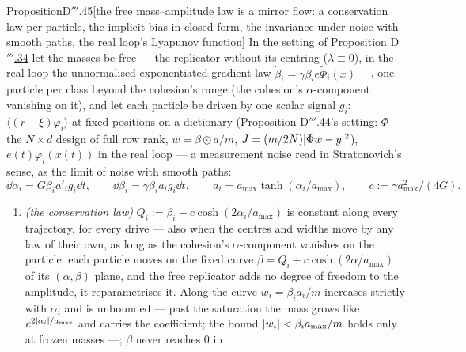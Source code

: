 \begin{thm}{Proposition}{D$'''$.45}[the free mass--amplitude law is a mirror flow: a conservation law per particle, the
implicit bias in closed form, the invariance under noise with smooth paths, the real loop's Lyapunov
function]\label{res:thmDppp:45}%
In the setting of \hyperref[res:thmDppp:34]{Proposition D$'''$.34} let the masses be free --- the replicator without its
centring ($\lambda\equiv0$), in the real loop the unnormalised exponentiated-gradient law
$\dot\beta_i = \gamma\beta_ie\tilde\Phi_i(x)$ ---, one particle per class beyond the cohesion's range (the cohesion's
$\alpha$-component vanishing on it), and let each particle be driven by one scalar signal $g_i$:
$\langle(r + \xi)\varphi_i\rangle$ at fixed positions on a dictionary (Proposition D$'''$.44's setting: $\Phi$ the
$N\times d$ design of full row rank, $w = \beta\odot a/m$, $J = (m/2N)\lvert \Phi w - y\rvert^2$), $e(t)\varphi_i(x(t))$ in the
real loop --- a measurement noise read in Stratonovich's sense, as the limit of noise with smooth paths:
\[
  \dd\alpha_i = G\beta_ia'_ig_i\dd t,\qquad \dd\beta_i = \gamma\beta_ia_ig_i\dd t,\qquad
  a_i = a_{\max}\tanh(\alpha_i/a_{\max}),\qquad c := \gamma a_{\max}^2/(4G).
\]
\begin{enumerate}[label=\textup{(\roman*)}]
  \item \emph{(the conservation law)} $Q_i := \beta_i - c\cosh(2\alpha_i/a_{\max})$ is constant along every
    trajectory, for every drive --- also when the centres and widths move by any law of their own, as long as the
    cohesion's $\alpha$-component vanishes on the particle: each particle moves on the fixed curve
    $\beta = Q_i + c\cosh(2\alpha/a_{\max})$ of its $(\alpha,\beta)$ plane, and the free replicator adds no degree of
    freedom to the amplitude, it reparametrises it. Along the curve $w_i = \beta_ia_i/m$ increases strictly with
    $\alpha_i$ and is unbounded --- past the saturation the mass grows like $e^{2\lvert \alpha_i\rvert/a_{\max}}$ and carries
    the coefficient; the bound $\lvert w_i\rvert < \beta_ia_{\max}/m$ holds only at frozen masses ---; $\beta$ never reaches 0 in

\end{enumerate}
\end{thm}
